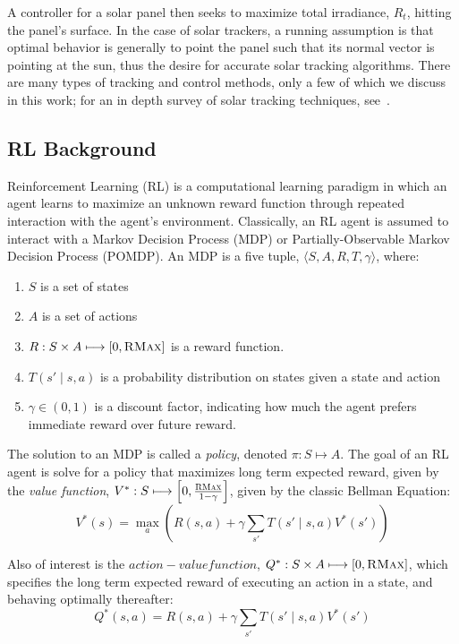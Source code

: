 \documentclass{article}
\begin{document}
A controller for a solar panel then seeks to maximize total irradiance, $R_t$, hitting the panel's surface. In the case of solar trackers, a running assumption is that optimal behavior is generally to point the panel such that its normal vector is pointing at the sun, thus the desire for accurate solar tracking algorithms. There are many types of tracking and control methods, only a few of which we discuss in this work; for an in depth survey of solar tracking techniques, see~\citet{mousazadeh2009review}.

\subsection{RL Background}

Reinforcement Learning (RL) is a computational learning paradigm in which an agent learns to maximize an unknown reward function through repeated interaction with the agent's environment. Classically, an RL agent is assumed to interact with a Markov Decision Process (MDP) or Partially-Observable Markov Decision Process (POMDP). An MDP is a five tuple, $\langle S, A, R, T, \gamma \rangle$, where:
\begin{enumerate}
\item $S$ is a set of states
\item $A$ is a set of actions
\item $R : S \times A \longmapsto [0,\textsc{RMax}] $ is a reward function.
\item $T(s' \mid s,a)$ is a probability distribution on states given a state and action
\item $\gamma \in (0,1)$ is a discount factor, indicating how much the agent prefers immediate reward over future reward.
\end{enumerate}

The solution to an MDP is called a {\it policy}, denoted $\pi : S \longmapsto A$. The goal of an RL agent is solve for a policy that maximizes long term expected reward, given by the {\it value function}, $V^* : S \longmapsto \left[0,\frac{\textsc{RMax}}{1-\gamma}\right]$, given by the classic Bellman Equation:
\begin{equation}
V^*(s) = \max_a \left(R(s,a) + \gamma \sum_{s'} T(s' \mid s, a) V^*(s') \right)
\end{equation}

Also of interest is the $action-value function$, $Q^*: S \times A \longmapsto [0,\textsc{RMax}]$, which specifies the long term expected reward of executing an action in a state, and behaving optimally thereafter:
\begin{equation}
Q^*(s,a) = R(s,a) + \gamma \sum_{s'} T(s' \mid s,a) V^*(s')
\end{equation}
\end{document}
